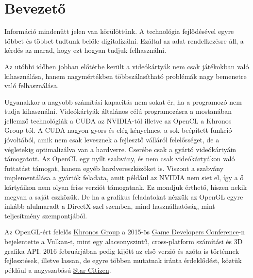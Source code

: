 
\section{Bevezet\H o}
Inform\'aci\'o minden\"utt jelen van k\"or\"ul\"ott\"unk. A technol\'ogia fejl\H od\'es\'evel egyre t\"obbet \'es t\"obbet tudtunk bel\H ole digitaliz\'alni. Ez\'altal az adat rendelkez\'esre \'all, a k\'erd\'es az marad, hogy ezt hogyan tudjuk felhaszn\'alni.

Az ut\'obbi id\H oben jobban el\H ot\'erbe ker\"ult a vide\'ok\'arty\'ak nem csak j\'at\'ekokban val\'o kihaszn\'al\'asa, hanem nagym\'ert\'ekben t\"obbsz\'alas\'ithat\'o probl\'em\'ak nagy bemenetre val\'o felhaszn\'al\'asa.

Ugyanakkor a nagyobb sz\'am\'it\'asi kapacit\'as nem sokat \'er, ha a programoz\'o nem tudja kihaszn\'alni.
Vide\'ok\'arty\'ak \'altal\'anos c\'el\'u programoz\'asra a mostan\'aban jellemz\H o technol\'ogi\'ak a CUDA az NVIDIA-t\'ol illetve az OpenCL a Khronos Group-t\'ol. A CUDA nagyon gyors \'es el\'eg k\'enyelmes, a sok be\'ep\'itett funkci\'o j\'ovolt\'ab\'ol, amik nem csak levesznek a fejleszt\H o v\'all\'ar\'ol felel\H oss\'eget, de a v\'egletekig optimaliz\'alva van a hardverre. Cser\'ebe csak a gy\'art\'o vide\'ok\'arty\'ain t\'amogatott.
Az OpenCL egy ny\'ilt szabv\'any, \'es nem csak vide\'ok\'arty\'akon val\'o futtat\'ast t\'amogat, hanem egy\'eb hardvereszk\"oz\"oket is. Viszont a szabv\'any implement\'al\'asa a gy\'art\'ok feladata, amit p\'eld\'aul az NVIDIA nem siet el, \'igy a \H o k\'arty\'aikon nem olyan friss verzi\'ot t\'amogatnak. Ez mondjuk \'erthet\H o, hiszen nekik megvan a saj\'at eszk\"oz\"uk.
De ha a grafikus feladatokat n\'ezz\"uk az OpenGL egyre ink\'abb alulmaradt a DirectX-szel szemben, mind haszn\'alhat\'os\'ag, mint teljes\'itm\'eny szempontj\'ab\'ol.

Az OpenGL-\'ert felel\H os \href{https://www.khronos.org/}{Khronos Group} a 2015-\"os \href{http://www.gdconf.com/}{Game Developers Conference}-n bejelentette a Vulkan-t, mint egy alacsonyszint\H u, cross-platform sz\'am\'it\'asi \'es 3D grafika API.
2016 febru\'arj\'aban pedig kij\"ott az els\H o verzi\'o \'es az\'ota is t\"ort\'ennek fejleszt\'esek, illetve lassan, de egyre t\"obben mutatnak ir\'anta \'erdekl\H od\'est, k\"ozt\"uk p\'eld\'aul a nagyszab\'as\'u \href{https://robertsspaceindustries.com/star-citizen}{Star Citizen}.

